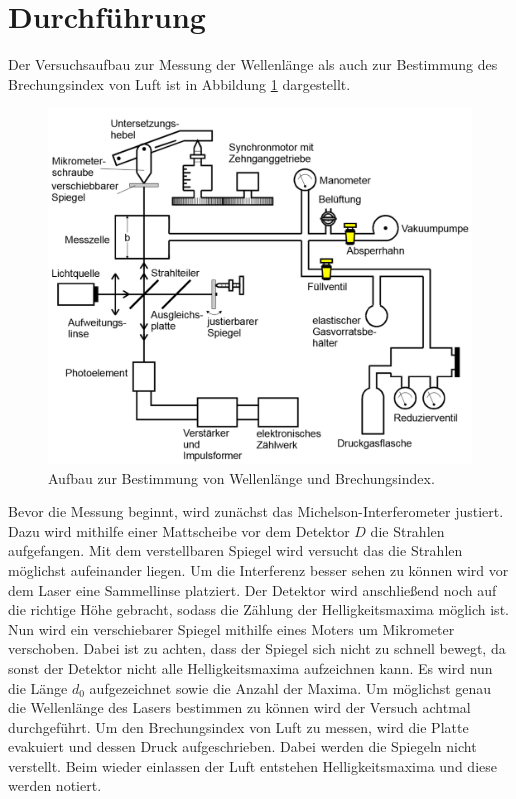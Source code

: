 \section{Durchführung}
Der Versuchsaufbau zur Messung der Wellenlänge als auch
zur Bestimmung des Brechungsindex von Luft ist in Abbildung \ref{abb:3}
dargestellt.
\begin{figure}[H]
  \includegraphics[width=\textwidth]{content/Aufbau3.png}
  \caption{Aufbau zur Bestimmung von Wellenlänge und Brechungsindex.\cite{1}}
  \label{abb:3}
\end{figure}
Bevor die Messung beginnt, wird zunächst das Michelson-Interferometer justiert.
Dazu wird mithilfe einer Mattscheibe vor dem Detektor $D$ die Strahlen aufgefangen.
Mit dem verstellbaren Spiegel wird versucht das die Strahlen möglichst aufeinander liegen.
Um die Interferenz besser sehen zu können wird vor dem Laser eine Sammellinse platziert.
Der Detektor wird anschließend noch auf die richtige Höhe gebracht, sodass die Zählung
der Helligkeitsmaxima möglich ist.
Nun wird ein verschiebarer Spiegel mithilfe eines Moters um Mikrometer verschoben.
Dabei ist zu achten, dass der Spiegel sich nicht zu schnell bewegt, da sonst der
Detektor nicht alle Helligkeitsmaxima aufzeichnen kann.
Es wird nun die Länge $d_0$ aufgezeichnet sowie die Anzahl der Maxima. Um möglichst
genau die Wellenlänge des Lasers bestimmen zu können wird der Versuch achtmal durchgeführt.
Um den Brechungsindex von Luft zu messen, wird die Platte evakuiert und dessen Druck aufgeschrieben.
Dabei werden die Spiegeln nicht verstellt. Beim wieder einlassen der Luft entstehen Helligkeitsmaxima
und diese werden notiert.
